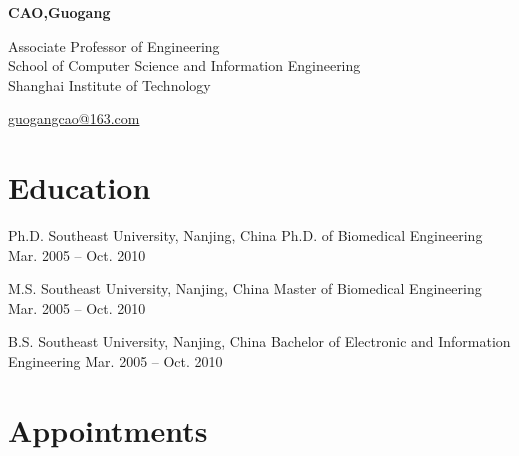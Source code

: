 \documentclass[11pt,letterpaper]{report}
\newcommand{\myname}{CAO,Guogang}
\newcommand{\namefont}[1]{{\normalfont\bfseries\Huge{#1}}}
\begin{document}
    \raggedright{}

    \namefont{\myname}

    \vspace{1em}
    \begin{minipage}[t]{0.700\textwidth}
        Associate Professor of Engineering \\
        School of Computer Science and Information Engineering \\
        Shanghai Institute of Technology
    \end{minipage}
    \begin{minipage}[t]{0.295\textwidth}
        \flushright{}
        \href{mailto:guogangcao@163.com}{guogangcao@163.com} 
    \end{minipage}


    \section*{Education}

    \begin{tablist}

        \item[Ph.D.] \tab{}Southeast University, Nanjing, China Ph.D. of Biomedical Engineering Mar. 2005 – Oct. 2010
        \item[M.S.]  \tab{}Southeast University, Nanjing, China Master of Biomedical Engineering Mar. 2005 – Oct. 2010
        \item[B.S.]  \tab{}Southeast University, Nanjing, China Bachelor of Electronic and Information Engineering	Mar. 2005 – Oct. 2010

    \end{tablist}



    \section*{Appointments}
\end{document}

